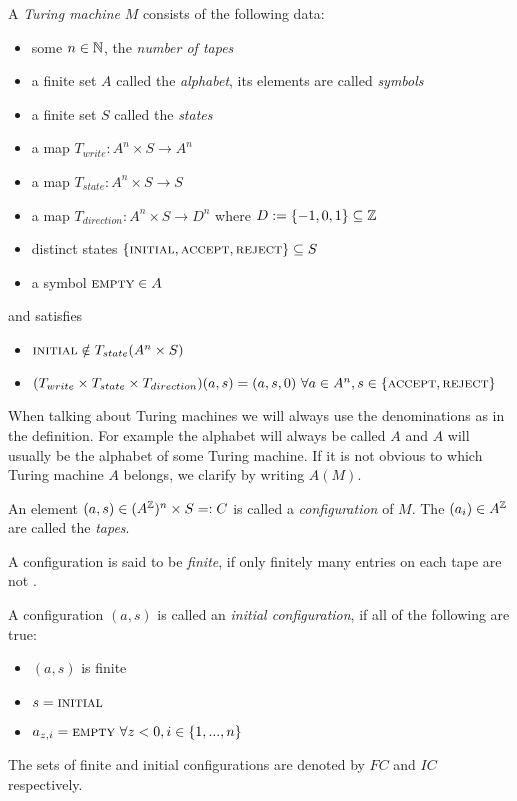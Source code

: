 \begin{Definition}
	A \emph{Turing machine} $M$ consists of the following data:
	\begin{itemize}
		\item{some $n \in \mathbb{N}$}, the \emph{number of tapes}
		\item{a finite set $A$ called the \emph{alphabet}, its elements are called \emph{symbols}}
		\item{a finite set $S$ called the \emph{states}}
		\item{a map $T_{write}: A^n \times S \to A^n$}
		\item{a map $T_{state}: A^n \times S \to S$}
		\item{a map $T_{direction}: A^n \times S \to D^n$ where $D := \{-1,0,1\} \subseteq \mathbb{Z}$}
		\item{distinct states $\{\text{\scshape{initial}},\text{\scshape{accept}},\text{\scshape{reject}}\} \subseteq S$}
		\item{a symbol $\text{\scshape{empty}} \in A$}
	\end{itemize}
	and satisfies
	\begin{itemize}
		\item{$\text{\scshape{initial}} \notin T_{state}(A^n \times S)$}
		\item{$(T_{write} \times T_{state} \times T_{direction}) (a,s) = (a,s,0)~\forall a \in A^n , s \in \{\text{\scshape{accept}},\text{\scshape{reject}}\}$}
	\end{itemize}
\end{Definition}
When talking about Turing machines we will always use the denominations as in the definition.
For example the alphabet will always be called $A$ and $A$ will usually be the alphabet of some Turing machine.
If it is not obvious to which Turing machine $A$ belongs, we clarify by writing $A(M)$.

An element $(a,s) \in (A^{\mathbb{Z}})^n \times S =: C$ is called a \emph{configuration} of $M$. The $(a_i) \in A^{\mathbb{Z}}$ are called the \emph{tapes}.

A configuration is said to be \emph{finite}, if only finitely many entries on each tape are not \EMP.

A configuration $(a,s)$ is called an \emph{initial configuration}, if all of the following are true:
\begin{itemize}
	\item{$(a,s)$ is finite}
	\item{$s = \text{\scshape{initial}}$}
	\item{$a_{z,i} = \text{\scshape{empty}}~\forall z < 0, i \in \{1,...,n\}$}
\end{itemize}
The sets of finite and initial configurations are denoted by $FC$ and $IC$ respectively.

